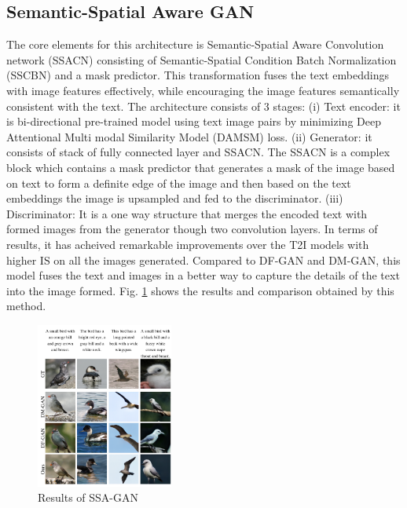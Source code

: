 \documentclass[conference]{IEEEtran}
\begin{document}
	\subsection{Semantic-Spatial Aware GAN}
	The core elements for this architecture is Semantic-Spatial Aware Convolution network (SSACN) consisting of Semantic-Spatial Condition Batch Normalization (SSCBN) and a mask predictor. This transformation fuses the text embeddings with image features effectively, while encouraging the image features semantically consistent with	the text. The architecture consists of 3 stages: (i) Text encoder: it is bi-directional pre-trained model using text image pairs by minimizing Deep Attentional Multi modal Similarity Model (DAMSM) loss. (ii) Generator: it consists of stack of fully connected layer and SSACN. The SSACN is a complex block which contains a mask predictor that generates a mask of the image based on text to form a definite edge of the image and then based on the text embeddings the image is upsampled and fed to the discriminator. (iii) Discriminator: It is a one way structure that merges the encoded text with formed images from the generator though two convolution layers. In terms of results, it has acheived remarkable improvements over the T2I models with higher IS on all the images generated. Compared to DF-GAN and DM-GAN, this model fuses the text and images in a better way to capture the details of the text into the image formed. Fig. \ref{gan_SSAGN} shows the results and comparison obtained by this method. 
	
	\begin{figure}[htbp]
		\centering
		\includegraphics[width=0.40\textwidth]{GAN_SSAGAN.png}
		\caption{Results of SSA-GAN \cite{b3}}
		\label{gan_SSAGN}
	\end{figure}
	
\end{document}
